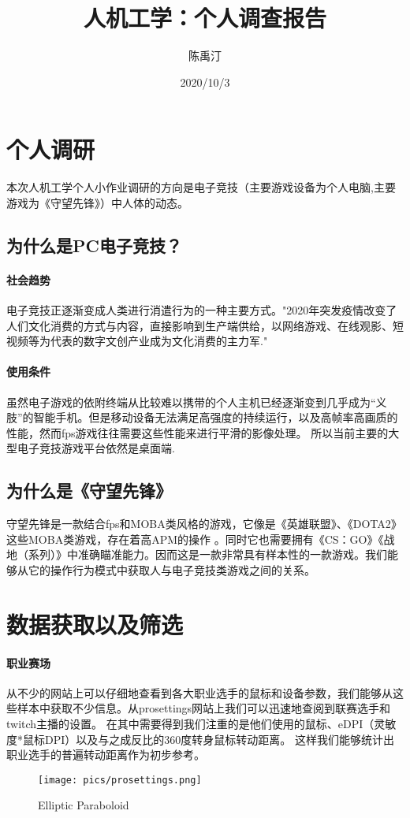 \documentclass[UTF8]{ctexart}
\title{人机工学：个人调查报告}
\author{陈禹汀}
\date{2020/10/3}
\begin{document}
\maketitle%
\newpage
\tableofcontents%
\newpage
\section{个人调研}
    本次人机工学个人小作业调研的方向是电子竞技（主要游戏设备为个人电脑,主要游戏为《守望先锋》）中人体的动态。
\subsection{为什么是PC电子竞技？}
\paragraph{社会趋势}
    电子竞技正逐渐变成人类进行消遣行为的一种主要方式。"2020年突发疫情改变了人们文化消费的方式与内容，直接影响到生产端供给，以网络游戏、在线观影、短视频等为代表的数字文创产业成为文化消费的主力军." \cite{esports}
\paragraph{使用条件}
    虽然电子游戏的依附终端从比较难以携带的个人主机已经逐渐变到几乎成为“义肢”的智能手机。但是移动设备无法满足高强度的持续运行，以及高帧率高画质的性能，然而fps游戏往往需要这些性能来进行平滑的影像处理。 \cite{framerate}所以当前主要的大型电子竞技游戏平台依然是桌面端.

\subsection{为什么是《守望先锋》}
    守望先锋是一款结合fps和MOBA类风格的游戏，它像是《英雄联盟》、《DOTA2》这些MOBA类游戏，存在着高APM的操作 \cite{wiki:APM}。同时它也需要拥有《CS：GO》《战地（系列）》中准确瞄准能力。因而这是一款非常具有样本性的一款游戏。我们能够从它的操作行为模式中获取人与电子竞技类游戏之间的关系。

\section{数据获取以及筛选}
\paragraph{职业赛场}
    从不少的网站上可以仔细地查看到各大职业选手的鼠标和设备参数，我们能够从这些样本中获取不少信息。从prosettings网站上我们可以迅速地查阅到联赛选手和twitch主播的设置。 \cite{prosetting_edpi}在其中需要得到我们注重的是他们使用的鼠标、eDPI（灵敏度*鼠标DPI）以及与之成反比的360度转身鼠标转动距离。 \cite{prosetting_guide}这样我们能够统计出职业选手的普遍转动距离作为初步参考。

    \begin{figure}[h]
        \centering
        \texttt{[image: pics/prosettings.png]}
        \caption{Elliptic Paraboloid}
        \label{1}
    \end{figure} 


    
\end{document}
